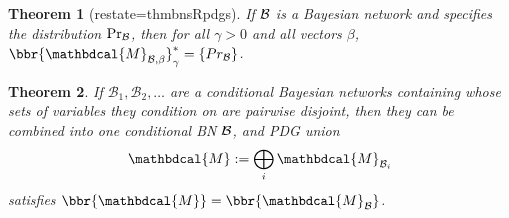 \documentclass{article}
\theoremstyle{plain}
\newtheorem{theorem}{Theorem}[section]
\theoremstyle{definition}
\theoremstyle{remark}
\newcommand{\dg}[1]{\mathbdcal{#1}}
\newcommand{\PDGof}[1]{{\dg M}_{#1}}
\numberwithin{equation}{section}
\begin{document}
	
	\begin{theorem}[restate=thmbnsRpdgs]\label{thm:bns-are-pdgs}
 	  If $\cal B$ is a Bayesian network
                    and specifies the distribution $\Pr_{\cal B}$, then 
    for all $\gamma > 0$ and all vectors $\beta$,
    $\bbr{\PDGof{\mathcal B, \beta}}_\gamma^* = \{Pr_{\cal B}\}$. 
	\end{theorem}

	\begin{vfull}
		\begin{theorem}
			If $\mathcal B_1, \mathcal B_2, \ldots$ are a
                        conditional Bayesian networks containing whose
                        sets of variables they condition on are
                        pairwise disjoint, then they can be combined
                        into one conditional BN $\cal B$, and  PDG
                        union 
 	\[ {\dg M} := \bigoplus_i
\PDGof{\mathcal B_i} \]  
			satisfies
			$\bbr{\dg M} = \bbr{\PDGof{\cal B}}$.
		\end{theorem}
	\end{vfull}
\end{document}
